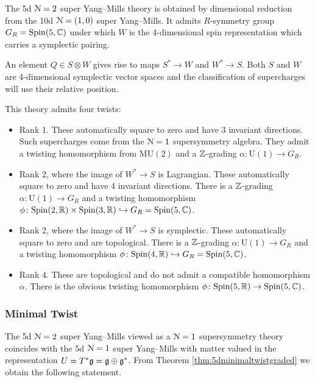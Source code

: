 \documentclass[10pt, oneside]{article}
\newcommand{\MU}{\mathrm{MU}}
\renewcommand{\U}{\mathrm{U}}
\begin{document}
The 5d $\mathcal N=2$ super Yang--Mills theory is obtained by dimensional reduction from the 10d $\mathcal N=(1, 0)$ super Yang--Mills. It admits $R$-symmetry group $G_R=\mathrm{Spin}(5, \mathbb C)$ under which $W$ is the 4-dimensional spin representation which carries a symplectic pairing.

An element $Q\in S\otimes W$ gives rise to maps $S^*\rightarrow W$ and $W^*\rightarrow S$. Both $S$ and $W$ are 4-dimensional symplectic vector spaces and the classification of supercharges will use their relative position.

This theory admits four twists:
\begin{itemize}
\item Rank 1. These automatically square to zero and have 3 invariant directions. Such supercharges come from the $\mathcal N=1$ supersymmetry algebra. They admit a twisting homomorphism from $\MU(2)$ and a $\mathbb Z$-grading $\alpha\colon \U(1)\rightarrow G_R$.

\item Rank 2, where the image of $W^*\rightarrow S$ is Lagrangian. These automatically square to zero and have 4 invariant directions. There is a $\mathbb Z$-grading $\alpha\colon \U(1)\rightarrow G_R$ and a twisting homomorphism $\phi\colon \mathrm{Spin}(2, \mathbb R)\times \mathrm{Spin}(3, \mathbb R)\hookrightarrow G_R=\mathrm{Spin}(5, \mathbb C)$.

\item Rank 2, where the image of $W^*\rightarrow S$ is symplectic. These automatically square to zero and are topological. There is a $\mathbb Z$-grading $\alpha\colon \U(1)\rightarrow G_R$ and a twisting homomorphism $\phi\colon \mathrm{Spin}(4, \mathbb R)\hookrightarrow G_R=\mathrm{Spin}(5, \mathbb C)$.

\item Rank 4. These are topological and do not admit a compatible homomorphism $\alpha$. There is the obvious twisting homomorphism $\phi\colon \mathrm{Spin}(5, \mathbb R)\rightarrow \mathrm{Spin}(5, \mathbb C)$.
\end{itemize}

\subsubsection{Minimal Twist}
\label{sect:5dminimaltwist}

The 5d $\mathcal N=2$ super Yang--Mills viewed as a $\mathcal N=1$ supersymmetry theory coincides with the 5d $\mathcal N=1$ super Yang--Mills with matter valued in the representation $U=T^*\mathfrak g=\mathfrak g\oplus \mathfrak g^*$. From Theorem \ref{thm:5dminimaltwistgraded} we obtain the following statement.
\end{document}
